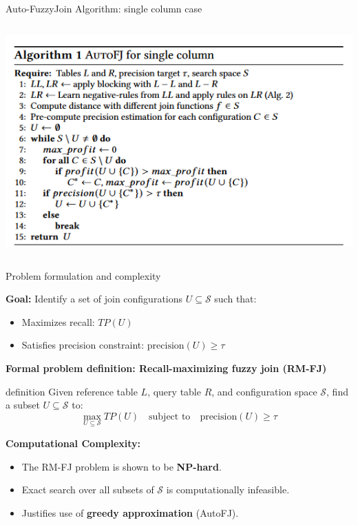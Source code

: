 \documentclass[8pt]{beamer} %
\begin{document}
\begin{frame}{Auto-FuzzyJoin Algorithm: single column case}
\begin{columns}
		\begin{column}{0.45\textwidth}
			\centering
			\includegraphics[width=\linewidth]{img/img-autofj-algorithm.png}
		\end{column}
	\end{columns}
\end{frame}

\begin{frame}{Problem formulation and complexity}
	
	\textbf{Goal:} Identify a set of join configurations $U \subseteq \mathcal{S}$ such that:
	\begin{itemize}
		\item Maximizes recall: $TP(U)$
		\item Satisfies precision constraint: $\text{precision}(U) \geq \tau$
	\end{itemize}
	
	\vspace{1em}
	\textbf{Formal problem definition: Recall-maximizing fuzzy join (RM-FJ)} \\
		
	\begin{beamercolorbox}[rounded=true, shadow=true, leftskip=1em, rightskip=1em]{definition}
		Given reference table $L$, query table $R$, and configuration space $\mathcal{S}$, find a subset $U \subseteq \mathcal{S}$ to:
		$$
		\max_{U \subseteq \mathcal{S}} TP(U) \quad \text{subject to} \quad \text{precision}(U) \geq \tau
		$$
	\end{beamercolorbox}
	
	\vspace{1em}
	\textbf{Computational Complexity:}
	\begin{itemize}
		\item The RM-FJ problem is shown to be \textbf{NP-hard}.
		\item Exact search over all subsets of $\mathcal{S}$ is computationally infeasible.
		\item Justifies use of \textbf{greedy approximation} (AutoFJ).
	\end{itemize}
	
\end{frame}
\end{document}
